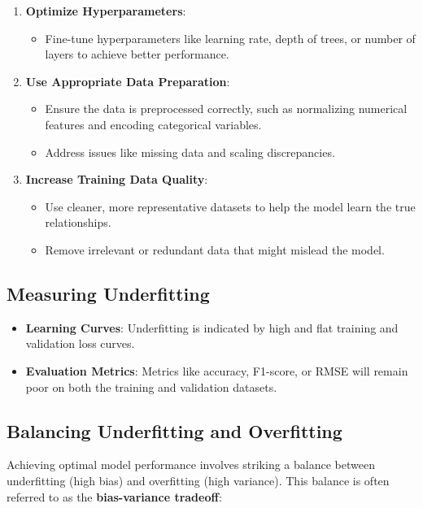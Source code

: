 \begin{enumerate}
    \item \textbf{Optimize Hyperparameters}:
    \begin{itemize}
        \item Fine-tune hyperparameters like learning rate, depth of trees, or number of layers to achieve better performance.
    \end{itemize}

    \item \textbf{Use Appropriate Data Preparation}:
    \begin{itemize}
        \item Ensure the data is preprocessed correctly, such as normalizing numerical features and encoding categorical variables.
        \item Address issues like missing data and scaling discrepancies.
    \end{itemize}

    \item \textbf{Increase Training Data Quality}:
    \begin{itemize}
        \item Use cleaner, more representative datasets to help the model learn the true relationships.
        \item Remove irrelevant or redundant data that might mislead the model.
    \end{itemize}
\end{enumerate}

\subsection*{Measuring Underfitting}
\begin{itemize}
    \item \textbf{Learning Curves}: Underfitting is indicated by high and flat training and validation loss curves.
    \item \textbf{Evaluation Metrics}: Metrics like accuracy, F1-score, or RMSE will remain poor on both the training and validation datasets.
\end{itemize}

\subsection*{Balancing Underfitting and Overfitting}
Achieving optimal model performance involves striking a balance between underfitting (high bias) and overfitting (high variance). This balance is often referred to as the \textbf{bias-variance tradeoff}:

